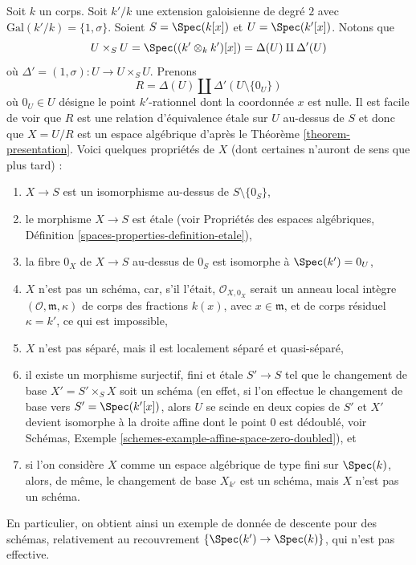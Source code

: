\begin{example}
\label{example-non-representable-descent}
Soit $k$ un corps. Soit $k'/k$ une extension galoisienne de degré $2$
avec $\text{Gal}(k'/k) = \{1, \sigma\}$. Soient $S = \Spec(k[x])$
et $U = \Spec(k'[x])$. Notons que
$$
U \times_S U =
\Spec((k' \otimes_k k')[x]) =
\Delta(U) \amalg \Delta'(U)
$$
où $\Delta' = (1, \sigma) : U \to U \times_S U$. Prenons
$$
R = \Delta(U) \amalg \Delta'(U \setminus \{0_U\})
$$
où $0_U \in U$ désigne le point $k'$-rationnel dont la coordonnée $x$ est nulle.
Il est facile de voir que $R$ est une relation d'équivalence \'etale sur $U$ au-dessus de $S$
et donc que $X = U/R$ est un espace algébrique d'après le
Théorème \ref{theorem-presentation}. Voici quelques propriétés de $X$ (dont certaines
n'auront de sens que plus tard) :
\begin{enumerate}
\item $X \to S$ est un isomorphisme au-dessus de $S \setminus \{0_S\}$,
\item le morphisme $X \to S$ est \'etale (voir
Propriétés des espaces algébriques,
Définition \ref{spaces-properties-definition-etale}),
\item la fibre $0_X$ de $X \to S$ au-dessus de $0_S$ est isomorphe à
$\Spec(k') = 0_U$,
\item $X$ n'est pas un schéma, car, s'il l'était, $\mathcal{O}_{X, 0_X}$
serait un anneau local intègre $(\mathcal{O}, \mathfrak m, \kappa)$ de
corps des fractions $k(x)$, avec $x \in \mathfrak m$, et de corps résiduel
$\kappa = k'$, ce qui est impossible,
\item $X$ n'est pas séparé, mais il est
localement séparé et quasi-séparé,
\item il existe un morphisme surjectif, fini et \'etale $S' \to S$
tel que le changement de base $X' = S' \times_S X$ soit un schéma (en effet, si
l'on effectue le changement de base vers $S' = \Spec(k'[x])$, alors $U$ se scinde en
deux copies de $S'$ et $X'$ devient isomorphe à la droite affine dont le point
$0$ est dédoublé, voir
Schémas, Exemple \ref{schemes-example-affine-space-zero-doubled}), et
\item si l'on considère $X$ comme un espace algébrique de type fini sur
$\Spec(k)$, alors, de même, le changement de base $X_{k'}$ est un schéma,
mais $X$ n'est pas un schéma.
\end{enumerate}
En particulier, on obtient ainsi un exemple de donnée de descente pour des schémas,
relativement au recouvrement $\{\Spec(k') \to \Spec(k)\}$,
qui n'est pas effective.
\end{example}

